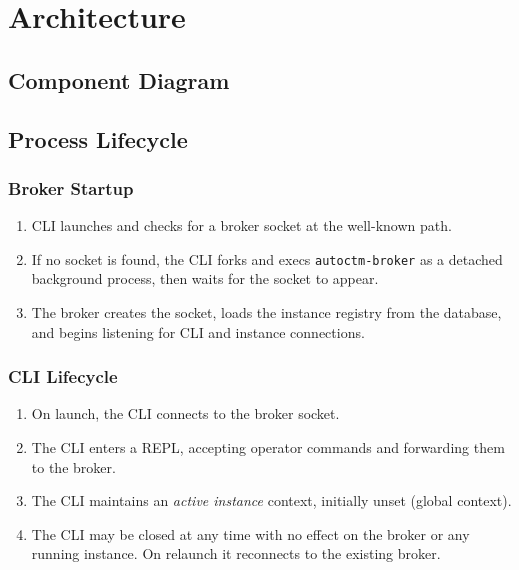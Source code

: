 \documentclass{article}
\begin{document}
\section{Architecture}

\subsection{Component Diagram}

\subsection{Process Lifecycle}

\subsubsection{Broker Startup}
\begin{enumerate}
    \item CLI launches and checks for a broker socket at the well-known path.
    \item If no socket is found, the CLI forks and execs \texttt{autoctm-broker}
    as a detached background process, then waits for the socket to appear.
    \item The broker creates the socket, loads the instance registry from the
    database, and begins listening for CLI and instance connections.
\end{enumerate}

\subsubsection{CLI Lifecycle}
\begin{enumerate}
    \item On launch, the CLI connects to the broker socket.
    \item The CLI enters a REPL, accepting operator commands and forwarding
    them to the broker.
    \item The CLI maintains an \textit{active instance} context, initially
    unset (global context).
    \item The CLI may be closed at any time with no effect on the broker or
    any running instance. On relaunch it reconnects to the existing broker.
\end{enumerate}
\end{document}
